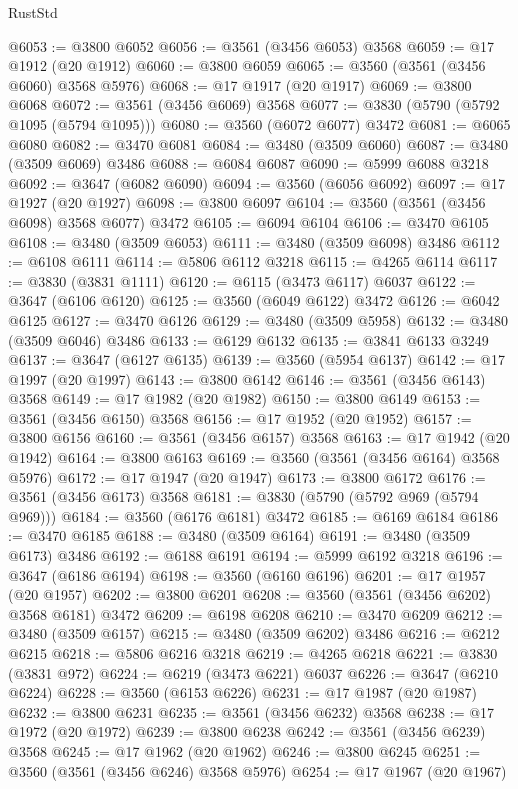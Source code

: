 \begin{lexlean}{RustStd}
\begin{coremodule}
@6053 := @3800 @6052
@6056 := @3561 (@3456 @6053) @3568
@6059 := @17 @1912 (@20 @1912)
@6060 := @3800 @6059
@6065 := @3560 (@3561 (@3456 @6060) @3568 @5976)
@6068 := @17 @1917 (@20 @1917)
@6069 := @3800 @6068
@6072 := @3561 (@3456 @6069) @3568
@6077 := @3830 (@5790 (@5792 @1095 (@5794 @1095)))
@6080 := @3560 (@6072 @6077) @3472
@6081 := @6065 @6080
@6082 := @3470 @6081
@6084 := @3480 (@3509 @6060)
@6087 := @3480 (@3509 @6069) @3486
@6088 := @6084 @6087
@6090 := @5999 @6088 @3218
@6092 := @3647 (@6082 @6090)
@6094 := @3560 (@6056 @6092)
@6097 := @17 @1927 (@20 @1927)
@6098 := @3800 @6097
@6104 := @3560 (@3561 (@3456 @6098) @3568 @6077) @3472
@6105 := @6094 @6104
@6106 := @3470 @6105
@6108 := @3480 (@3509 @6053)
@6111 := @3480 (@3509 @6098) @3486
@6112 := @6108 @6111
@6114 := @5806 @6112 @3218
@6115 := @4265 @6114
@6117 := @3830 (@3831 @1111)
@6120 := @6115 (@3473 @6117) @6037
@6122 := @3647 (@6106 @6120)
@6125 := @3560 (@6049 @6122) @3472
@6126 := @6042 @6125
@6127 := @3470 @6126
@6129 := @3480 (@3509 @5958)
@6132 := @3480 (@3509 @6046) @3486
@6133 := @6129 @6132
@6135 := @3841 @6133 @3249
@6137 := @3647 (@6127 @6135)
@6139 := @3560 (@5954 @6137)
@6142 := @17 @1997 (@20 @1997)
@6143 := @3800 @6142
@6146 := @3561 (@3456 @6143) @3568
@6149 := @17 @1982 (@20 @1982)
@6150 := @3800 @6149
@6153 := @3561 (@3456 @6150) @3568
@6156 := @17 @1952 (@20 @1952)
@6157 := @3800 @6156
@6160 := @3561 (@3456 @6157) @3568
@6163 := @17 @1942 (@20 @1942)
@6164 := @3800 @6163
@6169 := @3560 (@3561 (@3456 @6164) @3568 @5976)
@6172 := @17 @1947 (@20 @1947)
@6173 := @3800 @6172
@6176 := @3561 (@3456 @6173) @3568
@6181 := @3830 (@5790 (@5792 @969 (@5794 @969)))
@6184 := @3560 (@6176 @6181) @3472
@6185 := @6169 @6184
@6186 := @3470 @6185
@6188 := @3480 (@3509 @6164)
@6191 := @3480 (@3509 @6173) @3486
@6192 := @6188 @6191
@6194 := @5999 @6192 @3218
@6196 := @3647 (@6186 @6194)
@6198 := @3560 (@6160 @6196)
@6201 := @17 @1957 (@20 @1957)
@6202 := @3800 @6201
@6208 := @3560 (@3561 (@3456 @6202) @3568 @6181) @3472
@6209 := @6198 @6208
@6210 := @3470 @6209
@6212 := @3480 (@3509 @6157)
@6215 := @3480 (@3509 @6202) @3486
@6216 := @6212 @6215
@6218 := @5806 @6216 @3218
@6219 := @4265 @6218
@6221 := @3830 (@3831 @972)
@6224 := @6219 (@3473 @6221) @6037
@6226 := @3647 (@6210 @6224)
@6228 := @3560 (@6153 @6226)
@6231 := @17 @1987 (@20 @1987)
@6232 := @3800 @6231
@6235 := @3561 (@3456 @6232) @3568
@6238 := @17 @1972 (@20 @1972)
@6239 := @3800 @6238
@6242 := @3561 (@3456 @6239) @3568
@6245 := @17 @1962 (@20 @1962)
@6246 := @3800 @6245
@6251 := @3560 (@3561 (@3456 @6246) @3568 @5976)
@6254 := @17 @1967 (@20 @1967)

\end{coremodule}
\end{lexlean}
